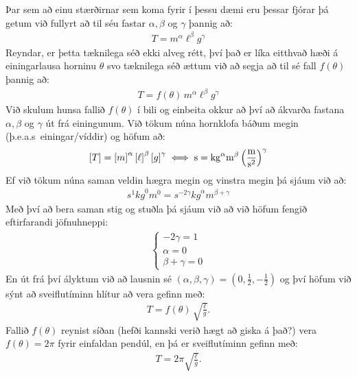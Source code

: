 \ifdefined \wholebook \else\documentclass[oneside]{book}\usepackage{EdlBook}\graphicspath{{figures/}}
\begin{document}
Þar sem að einu stærðirnar sem koma fyrir í þessu dæmi eru þessar fjórar þá getum við fullyrt að til séu fastar $\alpha, \beta$ og $\gamma$ þannig að:
\begin{align*}
    T = m^\alpha \ell^\beta g^\gamma
\end{align*}
Reyndar, er þetta tæknilega séð ekki alveg rétt, því það er líka eitthvað hæði á einingarlausa horninu $\theta$ svo tæknilega séð ættum við að segja að til sé fall $f(\theta)$ þannig að:
\begin{align*}
    T = f(\theta) \, m^\alpha \ell^\beta g^\gamma
\end{align*}
Við skulum hunsa fallið $f(\theta)$ í bili og einbeita okkur að því að ákvarða fastana $\alpha, \beta$ og $\gamma$ út frá einingunum. Við tökum núna hornklofa báðum megin (þ.e.a.s~einingar/víddir) og höfum að:
\begin{align*}
    \left[ T \right] = \left[ m \right]^\alpha \left[ \ell \right]^\beta \left[ g \right]^\gamma \iff \si{s} = \si{kg}^\alpha \si{m}^\beta \left(\si[per-mode=fraction]{\metre\per\second\squared}\right)^\gamma
\end{align*}
Ef við tökum núna saman veldin hægra megin og vinstra megin þá sjáum við að:
\begin{align*}
    \si{s}^1 \si{kg}^0 \si{m}^0 = \si{s}^{-2\gamma} \si{kg}^\alpha \si{m}^{\beta + \gamma}
\end{align*}
Með því að bera saman stig og stuðla þá sjáum við að við höfum fengið eftirfarandi jöfnuhneppi:
\begin{align*}
    \begin{cases} -2\gamma = 1 \\
    \alpha = 0 \\
    \beta + \gamma = 0\end{cases} 
\end{align*}
En út frá því ályktum við að lausnin sé $(\alpha, \beta, \gamma) = (0, \frac{1}{2},-\frac{1}{2})$ og því höfum við sýnt að sveiflutíminn hlítur að vera gefinn með:
\begin{align*}
    T = f(\theta) \, \sqrt{\frac{\ell}{g}}.
\end{align*}
Fallið $f(\theta)$ reynist síðan (hefði kannski verið hægt að giska á það?) vera $f(\theta) = 2\pi$ fyrir einfaldan pendúl, en þá er sveiflutíminn gefinn með:
\begin{align*}
    T = 2\pi \sqrt{\frac{\ell}{g}}.
\end{align*}

\newpage
\end{document}
